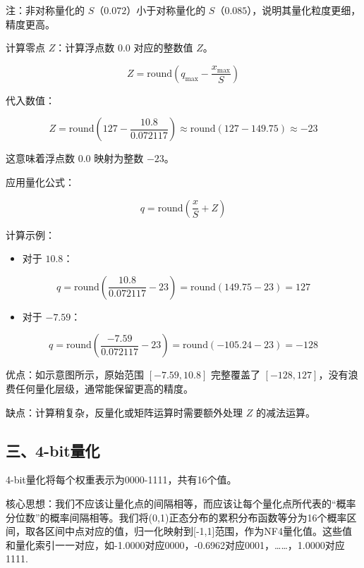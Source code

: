 注：非对称量化的 \(S\)（\(0.072\)）小于对称量化的 \(S\)（\(0.085\)），说明其量化粒度更细，精度更高。

计算零点 \(Z\)：计算浮点数 \(0.0\) 对应的整数值 \(Z\)。

\[
Z = \mathrm{round}\left(q_{\max} - \frac{x_{\max}}{S}\right)
\]

代入数值：

\[
Z = \mathrm{round}\left(127 - \frac{10.8}{0.072117}\right)
  \approx \mathrm{round}(127 - 149.75)
  \approx -23
\]

这意味着浮点数 \(0.0\) 映射为整数 \(-23\)。

应用量化公式：

\[
q = \mathrm{round}\left(\frac{x}{S} + Z\right)
\]

计算示例：

\begin{itemize}
\tightlist
\item
{}
  对于 \(10.8\)：
\end{itemize}

\[
q = \mathrm{round}\left(\frac{10.8}{0.072117} - 23\right)
  = \mathrm{round}(149.75 - 23)
  = 127
\]

\begin{itemize}
\tightlist
\item
{}
  对于 \(-7.59\)：
\end{itemize}

\[
q = \mathrm{round}\left(\frac{-7.59}{0.072117} - 23\right)
  = \mathrm{round}(-105.24 - 23)
  = -128
\]

优点：如示意图所示，原始范围 \([-7.59, 10.8]\) 完整覆盖了 \([-128, 127]\)，没有浪费任何量化层级，通常能保留更高的精度。

缺点：计算稍复杂，反量化或矩阵运算时需要额外处理 \(Z\) 的减法运算。

\hypertarget{ux4e094-bitux91cfux5316}{%
\subsection{三、4-bit量化}\label{ux4e094-bitux91cfux5316}}

4-bit量化将每个权重表示为0000-1111，共有16个值。

核心思想：我们不应该让量化点的间隔相等，而应该让每个量化点所代表的``概率分位数''的概率间隔相等。我们将(0,1)正态分布的累积分布函数等分为16个概率区间，取各区间中点对应的值，归一化映射到{[}-1,1{]}范围，作为NF4量化值。这些值和量化索引一一对应，如-1.0000对应0000，-0.6962对应0001，\ldots\ldots，1.0000对应1111.

